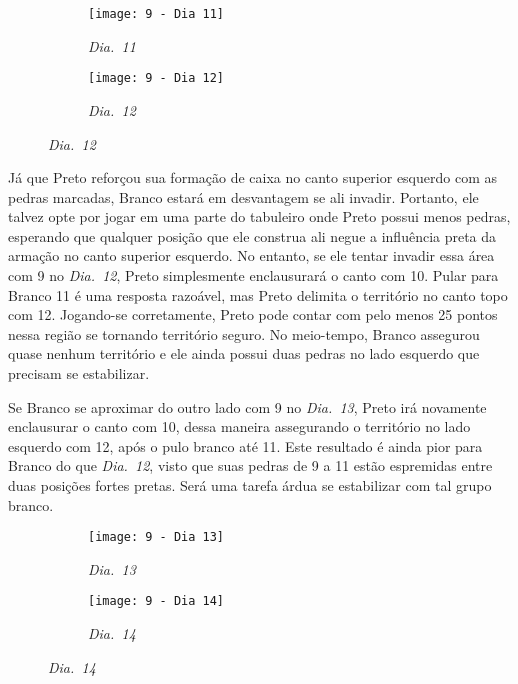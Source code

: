 \begin{figure}[h!]
    \centering
    \begin{subfigure}[t]{.45\textwidth}
        \texttt{[image: 9 - Dia 11]}
        \caption*{\emph{Dia.\@~11}}
    \end{subfigure}
    \hspace{1cm}
    \begin{subfigure}[t]{.45\textwidth}
        \texttt{[image: 9 - Dia 12]}
        \caption*{\emph{Dia.\@~12}}
    \end{subfigure}
\end{figure}

Já que Preto reforçou sua formação de caixa no canto superior esquerdo com as pedras marcadas, Branco estará em desvantagem se ali invadir. Portanto, ele talvez opte por jogar em uma parte do tabuleiro onde Preto possui menos pedras, esperando que qualquer posição que ele construa ali negue a influência preta da armação no canto superior esquerdo. No entanto, se ele tentar invadir essa área com 9 no \emph{Dia.\@~12}, Preto simplesmente enclausurará o canto com 10. Pular para Branco 11 é uma resposta razoável, mas Preto delimita o território no canto topo com 12. Jogando-se corretamente, Preto pode contar com pelo menos 25 pontos nessa região se tornando território seguro. No meio-tempo, Branco assegurou quase nenhum território e ele ainda possui duas pedras no lado esquerdo que precisam se estabilizar.

\pagebreak

Se Branco se aproximar do outro lado com 9 no \emph{Dia.\@~13}, Preto irá novamente enclausurar o canto com 10, dessa maneira assegurando o território no lado esquerdo com 12, após o pulo branco até 11. Este resultado é ainda pior para Branco do que \emph{Dia.\@~12}, visto que suas pedras de 9 a 11 estão espremidas  entre duas posições fortes pretas. Será uma tarefa árdua se estabilizar com tal grupo branco.

\begin{figure}[h!]
    \centering
    \begin{subfigure}[t]{.45\textwidth}
        \texttt{[image: 9 - Dia 13]}
        \caption*{\emph{Dia.\@~13}}
    \end{subfigure}
    \hspace{1cm}
    \begin{subfigure}[t]{.45\textwidth}
        \texttt{[image: 9 - Dia 14]}
        \caption*{\emph{Dia.\@~14}}
    \end{subfigure}
\end{figure}

